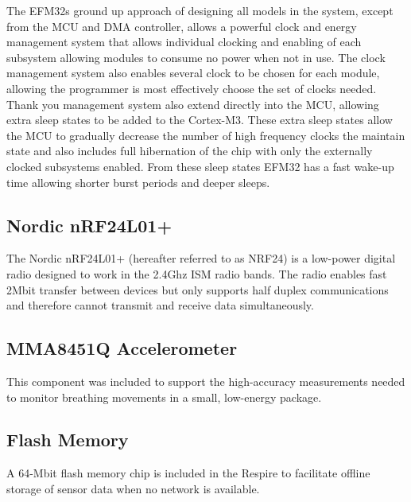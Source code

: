 The EFM32s ground up approach of designing all models in the system, except from the \ac{MCU} and \ac{DMA} controller,
allows a powerful clock and energy management system that allows individual clocking and enabling
of each subsystem allowing modules to consume no power when not in use. The clock management
system also enables several clock to be chosen for each module, allowing the programmer is most
effectively choose the set of clocks needed. Thank you management system also extend directly into
the \ac{MCU}, allowing extra sleep states to be added to the Cortex-M3. These extra sleep states allow
the \ac{MCU} to gradually decrease the number of high frequency clocks the maintain state and
also includes full hibernation of the chip with only the externally clocked subsystems
enabled. From these sleep states EFM32 has a fast wake-up time allowing shorter burst
periods and deeper sleeps.

\subsection{Nordic nRF24L01+}
The Nordic nRF24L01+ (hereafter referred to as NRF24) is a low-power digital radio
designed to work in the 2.4Ghz ISM radio bands. The radio enables fast 2Mbit transfer
between devices but only supports half duplex communications and therefore cannot transmit and
receive data simultaneously.

\subsection{MMA8451Q Accelerometer}
This component was included to support the high-accuracy measurements needed to monitor
breathing movements in a small, low-energy package.

\subsection{Flash Memory}
A 64-Mbit flash memory chip is included in the Respire to facilitate offline storage of sensor data
when no network is available.


